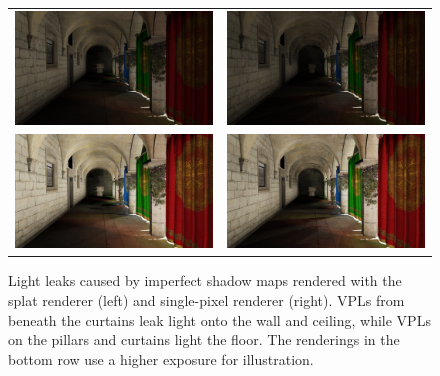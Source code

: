 \begin{figure}[htb]
\centering
  \begin{tabular}{@{}cc@{}}
    \includegraphics[width=.48\textwidth]{screenshots/leaks_splat} &
    \includegraphics[width=.48\textwidth]{screenshots/leaks_single_pixel}\\
    \includegraphics[width=.48\textwidth]{screenshots/leaks_splat_exposure} &
    \includegraphics[width=.48\textwidth]{screenshots/leaks_single_pixel_exposure}
  \end{tabular}
  \caption{Light leaks caused by imperfect shadow maps rendered with the splat renderer (left) and single-pixel renderer (right). VPLs from beneath the curtains leak light onto the wall and ceiling, while VPLs on the pillars and curtains light the floor. The renderings in the bottom row use a higher exposure for illustration. }
  \label{fig:results:leaks}
\end{figure}


